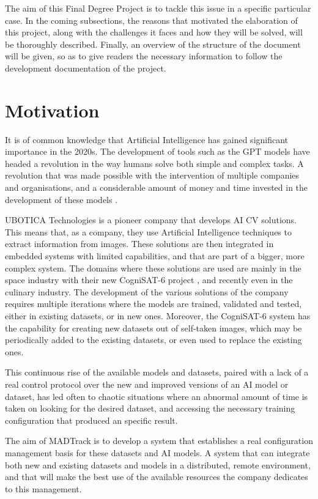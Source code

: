The aim of this Final Degree Project is to tackle this issue in a specific particular case. In the coming subsections, the reasons that motivated the elaboration
of this project, along with the challenges it faces and how they will be solved, will be thoroughly described. Finally, an overview of the structure of the document
will be given, so as to give readers the necessary information to follow the development documentation of the project.

\section{Motivation}

It is of common knowledge that Artificial Intelligence has gained significant importance in the 2020s. The development of tools such as the GPT models
have headed a revolution in the way humans solve both simple and complex tasks. A revolution that was made possible with the intervention of multiple
companies and organisations, and a considerable amount of money and time invested in the development of these models \cite{AIRise}.

UBOTICA Technologies is a pioneer company that develops \acrshort{AI} \acrfull{CV} solutions. This means that, as a company, they use Artificial Intelligence
techniques to extract information from images. These solutions are then integrated in embedded systems with limited capabilities, and that are part of a 
bigger, more complex system. The domains where these solutions are used are mainly in the space industry with their new CogniSAT-6 project \cite{UBOTICACS6}, 
and recently even in the culinary industry. The development of the various solutions of the company requires multiple iterations where the models are trained,
validated and tested, either in existing datasets, or in new ones. Moreover, the CogniSAT-6 system has the capability for creating new datasets out of self-taken
images, which may be periodically added to the existing datasets, or even used to replace the existing ones.

This continuous rise of the available models and datasets, paired with a lack of a real control protocol over the new and improved versions of an AI model or dataset,
has led often to chaotic situations where an abnormal amount of time is taken on looking for the desired dataset, and accessing the necessary training configuration
that produced an specific result.

The aim of MADTrack is to develop a system that establishes a real configuration management basis for these datasets and AI models. A system that can integrate
both new and existing datasets and models in a distributed, remote environment, and that will make the best use of the available resources the company dedicates
to this management.

